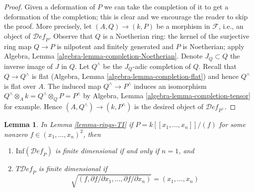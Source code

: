 \documentclass{stacks-project}
\theoremstyle{plain}
\newtheorem{lemma}[subsection]{Lemma}
\theoremstyle{definition}
\theoremstyle{remark}
\numberwithin{equation}{subsection}
\def\Deformationcategory{\mathcal{D}\!\mathit{ef}}
\begin{document}
\begin{proof}
Given a deformation of $P$ we can take the completion
of it to get a deformation of the completion; this is
clear and we encourage the reader to skip the proof. More precisely,
let $(A, Q) \to (k, P)$ be a morphism in $\mathcal{F}$, i.e.,
an object of $\Deformationcategory_P$. Observe that $Q$ is a Noetherian
ring: the kernel of the surjective ring map $Q \to P$ is
nilpotent and finitely generated and $P$ is Noetherian; apply
Algebra, Lemma \ref{algebra-lemma-completion-Noetherian}.
Denote $J_Q \subset Q$ the inverse
image of $J$ in $Q$. Let $Q^\wedge$ be the $J_Q$-adic completion of $Q$.
Recall that $Q \to Q^\wedge$ is flat
(Algebra, Lemma \ref{algebra-lemma-completion-flat})
and hence $Q^\wedge$ is flat over $A$.
The induced map $Q^\wedge \to P^\wedge$ induces an isomorphism
$Q^\wedge \otimes_A k = Q^\wedge \otimes_Q P = P^\wedge$ by
Algebra, Lemma \ref{algebra-lemma-completion-tensor} for example.
Hence $(A, Q^\wedge) \to (k, P^\wedge)$
is the desired object of $\Deformationcategory_{P^\wedge}$.
\end{proof}

\begin{lemma}
\label{lemma-power-series-rings-TI}
In Lemma \ref{lemma-rings-TI} if $P = k[[x_1, \ldots, x_n]]/(f)$
for some nonzero $f \in (x_1, \ldots, x_n)^2$, then
\begin{enumerate}
\item $\text{Inf}(\Deformationcategory_P)$ is finite dimensional
if and only if $n = 1$, and
\item $T\Deformationcategory_P$ is finite dimensional if
$$
\sqrt{(f, \partial f/\partial x_1, \ldots,  \partial f/\partial x_n)} =
(x_1, \ldots, x_n)
$$
\end{enumerate}
\end{lemma}
\end{document}
